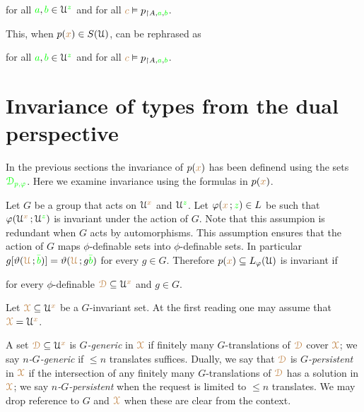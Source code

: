 \hfill for all ${\color{green} a},{\color{green} b}\in\EuScript U^{\color{green} z}$ and for all ${\color{brown} c}\vDash p_{\restriction A,{\color{green} a},{\color{green} b}}$.

This, when $p({\color{brown} x})\in S(\EuScript U)$, can be rephrased as

\hfill for all ${\color{green} a},{\color{green} b}\in\EuScript U^{\color{green} z}$ and for all ${\color{brown} c}\vDash p_{\restriction A,{\color{green} a},{\color{green} b}}$.

\section{Invariance of types from the dual perspective}

In the previous sections the invariance of $p({\color{brown} x})$ has been definend using the sets ${\color{green}\EuScript D_{p,\varphi}}$.
Here we examine invariance using the formulas in $p({\color{brown} x})$.

Let $G$ be a group that acts on $\EuScript U^{\color{brown} x}$ and $\EuScript U^{\color{green} z}$.
Let $\varphi({\color{brown} x}\,;{\color{green} z})\in L$ be such that $\varphi(\EuScript U^{\color{brown} x}\,;\EuScript U^{\color{green} z})$ is invariant under the action of $G$.
Note that this assumpion is redundant when $G$ acts by automorphisms.
This assumption ensures that the action of $G$ maps $\phi$-definable sets into $\phi$-definable sets.
In particular $g[\vartheta({\color{brown}\EuScript U}\,;{\color{green}\bar b})]=\vartheta({\color{brown}\EuScript U}\,;g{\color{green}\bar b})$ for every $g\in G$.
Therefore $p({\color{brown} x})\subseteq L_\varphi(\EuScript U)$ is invariant if

\hfill for every $\phi$-definable ${\color{brown}\EuScript D}\subseteq\EuScript U^{\color{brown} x}$ and $g\in G$.

Let ${\color{brown}\EuScript X}\subseteq\EuScript U^{\color{brown} x}$ be a $G$-invariant set.
At the first reading one may assume that ${\color{brown}\EuScript X}=\EuScript U^{\color{brown} x}$.%

A set ${\color{brown}\EuScript D}\subseteq\EuScript U^{\color{brown} x}$ is \emph{$G$-generic\/} in ${\color{brown}\EuScript X}$ if finitely many $G$-translations of ${\color{brown}\EuScript D}$ cover ${\color{brown}\EuScript X}$; we say \emph{$n$-$G$-generic\/} if $\le n$ translates suffices.
Dually, we say that ${\color{brown}\EuScript D}$ is \emph{$G$-persistent\/} in ${\color{brown}\EuScript X}$ if the intersection of any finitely many $G$-translations of ${\color{brown}\EuScript D}$ has a solution in ${\color{brown}\EuScript X}$; we say \emph{$n$-$G$-persistent\/} when the request is limited to $\le n$ translates.
We may drop reference to $G$ and ${\color{brown}\EuScript X}$ when these are clear from the context.

